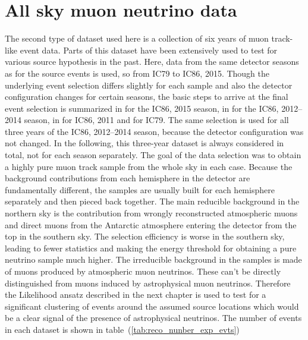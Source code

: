 \section{All sky muon neutrino data}
The second type of dataset used here is a collection of six years of muon track-like event data.
Parts of this dataset have been extensively used to test for various source hypothesis in the past.
Here, data from the same detector seasons as for the source events is used, so from IC79 to IC86, 2015.
Though the underlying event selection differs slightly for each sample and also the detector configuration changes for certain seasons, the basic steps to arrive at the final event selection is summarized in  for the IC86, 2015 season, in  for the IC86, 2012--2014 season, in  for IC86, 2011 and  for IC79.
The same selection is used for all three years of the IC86, 2012--2014 season, because the detector configuration was not changed.
In the following, this three-year dataset is always considered in total, not for each season separately.
The goal of the data selection was to obtain a highly pure muon track sample from the whole sky in each case.
Because the background contributions from each hemisphere in the detector are fundamentally different, the samples are usually built for each hemisphere separately and then pieced back together.
The main reducible background in the northern sky is the contribution from wrongly reconstructed atmospheric muons and direct muons from the Antarctic atmosphere entering the detector from the top in the southern sky.
The selection efficiency is worse in the southern sky, leading to fewer statistics and making the energy threshold for obtaining a pure neutrino sample much higher.
The irreducible background in the samples is made of muons produced by atmospheric muon neutrinos.
These can't be directly distinguished from muons induced by astrophysical muon neutrinos.
Therefore the Likelihood ansatz described in the next chapter is used to test for a significant clustering of events around the assumed source locations which would be a clear signal of the presence of astrophysical neutrinos.
The number of events in each dataset is shown in table~(\ref{tab:reco_nunber_exp_evts})

